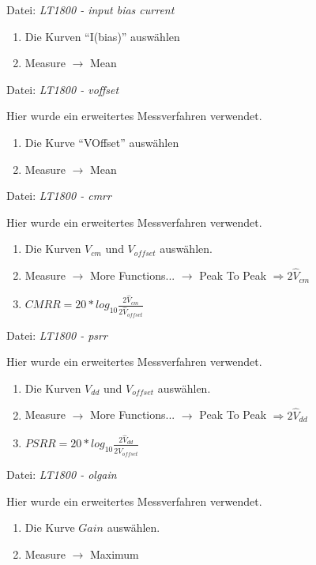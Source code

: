 \documentclass[
	ngerman,
	parskip=half,
	twocolumn,
	DIV=calc,
	]{scrartcl}
\begin{document}
	Datei: \emph{LT1800 - input bias current}
	\begin{enumerate}
		\item Die Kurven \enquote{I(bias)} auswählen
		\item Measure $\rightarrow$ Mean
	\end{enumerate}
	
	Datei: \emph{LT1800 - voffset}
	
	Hier wurde ein erweitertes Messverfahren \cite{website:amp_psrr_cmrr_circuits} verwendet.
	\begin{enumerate}
		\item Die Kurve \enquote{VOffset} auswählen
		\item Measure $\rightarrow$ Mean
	\end{enumerate}
	
	Datei: \emph{LT1800 - cmrr}
	
	Hier wurde ein erweitertes Messverfahren \cite{website:amp_psrr_cmrr_circuits} verwendet.
	\begin{enumerate}
		\item Die Kurven $V_{cm}$ und $V_{offset}$ auswählen.
		\item Measure $\rightarrow$ More Functions... $\rightarrow$ Peak To Peak $\Rightarrow 2\hat{V}_{cm}$
		\item $ CMRR = 20 * log_{10} \frac{2\hat{V}_{cm}}{2\hat{V}_{offset}}$
	\end{enumerate}
	
	Datei: \emph{LT1800 - psrr}
	
	Hier wurde ein erweitertes Messverfahren \cite{website:amp_psrr_cmrr_circuits} verwendet.
	\begin{enumerate}
		\item Die Kurven $V_{dd}$ und $V_{offset}$ auswählen.
		\item Measure $\rightarrow$ More Functions... $\rightarrow$ Peak To Peak $\Rightarrow 2\hat{V}_{dd}$
		\item $ PSRR = 20 * log_{10} \frac{2\hat{V}_{dd}}{2\hat{V}_{offset}}$
	\end{enumerate}
	
	Datei: \emph{LT1800 - olgain}
	
	Hier wurde ein erweitertes Messverfahren \cite{website:amp_psrr_cmrr_circuits} verwendet.
	\begin{enumerate}
		\item Die Kurve $Gain$ auswählen.
		\item Measure $\rightarrow$ Maximum
	\end{enumerate}
	
\end{document}
